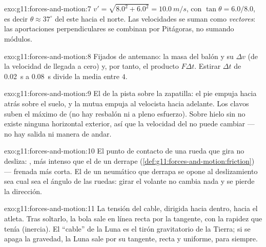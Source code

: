 \begin{solution}{exo:g11:forces-and-motion:7}
$v' = \sqrt{8.0^2 + 6.0^2} = \qty{10.0}{m/s}$, con
$\tan\theta = 6.0/8.0$, es decir $\theta \approx 37^\circ$ del este
hacia el norte. Las velocidades se suman como \emph{vectores}: las
aportaciones perpendiculares se combinan por Pitágoras, no sumando
módulos.
\end{solution}

\begin{solution}{exo:g11:forces-and-motion:8}
Fijados de antemano: la masa del balón y su $\Delta v$ (de la velocidad
de llegada a cero) y, por tanto, el producto $F\Delta t$. Estirar
$\Delta t$ de \qty{0.02}{s} a \qty{0.08}{s} divide la  media entre
$4$.
\end{solution}

\begin{solution}{exo:g11:forces-and-motion:9}
El  de la pista sobre la zapatilla: el pie empuja
hacia atrás sobre el suelo, y la  mutua empuja al
velocista hacia adelante. Los clavos suben el máximo de  (no hay resbalón ni a pleno esfuerzo). Sobre hielo sin
 no existe ninguna  horizontal exterior, así que la
velocidad del  no puede cambiar --- no hay salida ni
manera de andar.
\end{solution}

\begin{solution}{exo:g11:forces-and-motion:10}
El punto de contacto de una rueda que gira no desliza: , más intenso que el  de un derrape
(\cref{def:g11:forces-and-motion:friction}) --- frenada más corta. El
 de un neumático que derrapa se opone al
deslizamiento sea cual sea el ángulo de las ruedas: girar el volante no
cambia nada y se pierde la dirección.
\end{solution}

\begin{solution}{exo:g11:forces-and-motion:11}
La tensión del cable, dirigida hacia dentro, hacia el atleta. Tras
soltarlo, la bola sale en línea recta por la tangente, con la rapidez
que tenía (inercia). El ``cable'' de la Luna es el tirón gravitatorio de
la Tierra; si se apaga la gravedad, la Luna sale por su tangente, recta
y uniforme, para siempre.
\end{solution}


